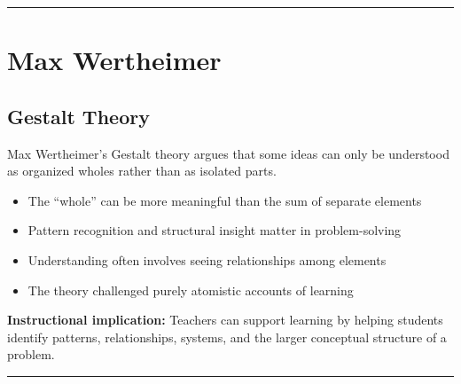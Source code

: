 \documentclass[
  letterpaper,
  DIV=11,
  numbers=noendperiod]{scrartcl}
\providecommand{\tightlist}{%
  \setlength{\itemsep}{0pt}\setlength{\parskip}{0pt}}\usepackage{longtable,booktabs,array}
\begin{document}
\begin{center}\rule{0.5\linewidth}{0.5pt}\end{center}

\section{Max Wertheimer}\label{max-wertheimer}

\subsection{Gestalt Theory}\label{gestalt-theory}

Max Wertheimer's Gestalt theory argues that some ideas can only be
understood as organized wholes rather than as isolated parts.

\begin{itemize}
\tightlist
\item
  The ``whole'' can be more meaningful than the sum of separate elements
\item
  Pattern recognition and structural insight matter in problem-solving
\item
  Understanding often involves seeing relationships among elements
\item
  The theory challenged purely atomistic accounts of learning
\end{itemize}

\textbf{Instructional implication:} Teachers can support learning by
helping students identify patterns, relationships, systems, and the
larger conceptual structure of a problem.

\begin{center}\rule{0.5\linewidth}{0.5pt}\end{center}
\end{document}
